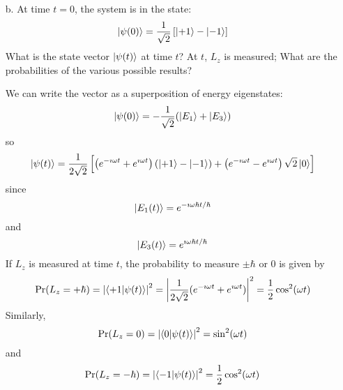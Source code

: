 \documentclass[a4paper,twoside]{article}
\begin{document}
\begin{itemize}
\begin{problem}
\begin{equation}
            \end{equation}
        \end{problem}
    \item[b.] At time $ t = 0 $, the system is in the state:
        \begin{equation}
            \ket{\psi(0)} = \frac{1}{\sqrt{2}} \left[\ket{+1} -\ket{-1} \right]
        \end{equation}
        What is the state vector $\ket{\psi(t)} $ at time $ t $? At $ t $, $ L_z $ is measured; What are the probabilities of the various possible results?
        \begin{problem}
            We can write the vector as a superposition of energy eigenstates:
            \begin{equation}
                \ket{\psi(0)} = - \frac{1}{\sqrt{2}} (\ket{E_1} +\ket{E_3})
            \end{equation}
            so
            \begin{equation}
                \ket{\psi(t)} = \frac{1}{2 \sqrt{2}}\left[ \left( e^{- \imath \omega t} + e^{\imath \omega t} \right)(\ket{+1} -\ket{-1}) + \left( e^{- \imath \omega t} - e^{\imath \omega t} \right) \sqrt{2} \ket{0}  \right]
            \end{equation}
            since
            \begin{equation}
                \ket{E_1(t)} = e^{- \imath \omega \hbar t / \hbar}
            \end{equation}
            and
            \begin{equation}
                \ket{E_3(t)} = e^{\imath \omega \hbar t / \hbar}
            \end{equation}
            If $ L_z $ is measured at time $ t $, the probability to measure $ \pm \hbar $ or $ 0 $ is given by
            \begin{equation}
                \Pr(L_z = + \hbar) = \abs{\bra{+1}\ket{\psi(t)}}^2 = \abs{\frac{1}{2 \sqrt{2}} (e^{- \imath \omega t} + e^{\imath \omega t})}^2 = \frac{1}{2} \cos[2](\omega t)
            \end{equation}
            Similarly,
            \begin{equation}
                \Pr(L_z = 0) = \abs{\bra{0}\ket{\psi(t)}}^2 = \sin[2](\omega t)
            \end{equation}
            and
            \begin{equation}
                \Pr(L_z = - \hbar) = \abs{\bra{-1}\ket{\psi(t)}}^2 = \frac{1}{2} \cos[2](\omega t)

\end{equation}
\end{problem}
\end{itemize}
\end{document}
